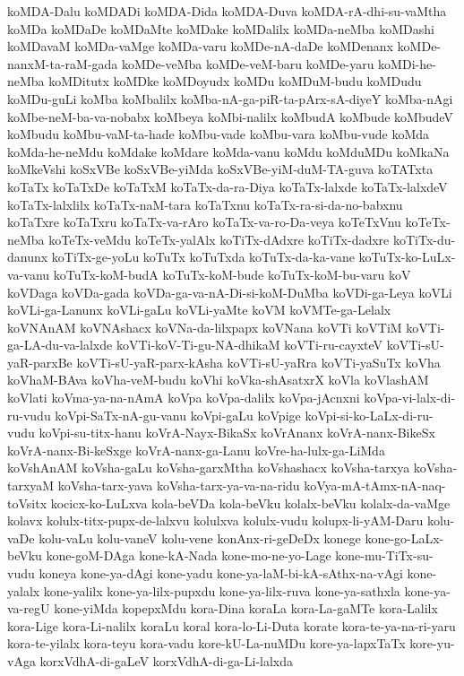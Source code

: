 {koMDA-Dalu
koMDADi
koMDA-Dida
koMDA-Duva
koMDA-rA-dhi-su-vaMtha
koMDa
koMDaDe
koMDaMte
koMDake
koMDalilx
koMDa-neMba
koMDashi
koMDavaM
koMDa-vaMge
koMDa-varu
koMDe-nA-daDe
koMDenanx
koMDe-nanxM-ta-raM-gada
koMDe-veMba
koMDe-veM-baru
koMDe-yaru
koMDi-he-neMba
koMDitutx
koMDke
koMDoyudx
koMDu
koMDuM-budu
koMDudu
koMDu-guLi
koMba
koMbalilx
koMba-nA-ga-piR-ta-pArx-sA-diyeY
koMba-nAgi
koMbe-neM-ba-va-nobabx
koMbeya
koMbi-nalilx
koMbudA
koMbude
koMbudeV
koMbudu
koMbu-vaM-ta-hade
koMbu-vade
koMbu-vara
koMbu-vude
koMda
koMda-he-neMdu
koMdake
koMdare
koMda-vanu
koMdu
koMduMDu
koMkaNa
koMkeVshi
koSxVBe
koSxVBe-yiMda
koSxVBe-yiM-duM-TA-guva
koTATxta
koTaTx
koTaTxDe
koTaTxM
koTaTx-da-ra-Diya
koTaTx-lalxde
koTaTx-lalxdeV
koTaTx-lalxlilx
koTaTx-naM-tara
koTaTxnu
koTaTx-ra-si-da-no-babxnu
koTaTxre
koTaTxru
koTaTx-va-rAro
koTaTx-va-ro-Da-veya
koTeTxVnu
koTeTx-neMba
koTeTx-veMdu
koTeTx-yalAlx
koTiTx-dAdxre
koTiTx-dadxre
koTiTx-du-danunx
koTiTx-ge-yoLu
koTuTx
koTuTxda
koTuTx-da-ka-vane
koTuTx-ko-LuLx-va-vanu
koTuTx-koM-budA
koTuTx-koM-bude
koTuTx-koM-bu-varu
koV
koVDaga
koVDa-gada
koVDa-ga-va-nA-Di-si-koM-DuMba
koVDi-ga-Leya
koVLi
koVLi-ga-Lanunx
koVLi-gaLu
koVLi-yaMte
koVM
koVMTe-ga-Lelalx
koVNAnAM
koVNAshacx
koVNa-da-lilxpapx
koVNana
koVTi
koVTiM
koVTi-ga-LA-du-va-lalxde
koVTi-koV-Ti-gu-NA-dhikaM
koVTi-ru-cayxteV
koVTi-sU-yaR-parxBe
koVTi-sU-yaR-parx-kAsha
koVTi-sU-yaRra
koVTi-yaSuTx
koVha
koVhaM-BAva
koVha-veM-budu
koVhi
koVka-shAsatxrX
koVla
koVlashAM
koVlati
koVma-ya-na-nAmA
koVpa
koVpa-dalilx
koVpa-jAcnxni
koVpa-vi-lalx-di-ru-vudu
koVpi-SaTx-nA-gu-vanu
koVpi-gaLu
koVpige
koVpi-si-ko-LaLx-di-ru-vudu
koVpi-su-titx-hanu
koVrA-Nayx-BikaSx
koVrAnanx
koVrA-nanx-BikeSx
koVrA-nanx-Bi-keSxge
koVrA-nanx-ga-Lanu
koVre-ha-lulx-ga-LiMda
koVshAnAM
koVsha-gaLu
koVsha-garxMtha
koVshashacx
koVsha-tarxya
koVsha-tarxyaM
koVsha-tarx-yava
koVsha-tarx-ya-va-na-ridu
koVya-mA-tAmx-nA-naq-toVsitx
kocicx-ko-LuLxva
kola-beVDa
kola-beVku
kolalx-beVku
kolalx-da-vaMge
kolavx
kolulx-titx-pupx-de-lalxvu
kolulxva
kolulx-vudu
kolupx-li-yAM-Daru
kolu-vaDe
kolu-vaLu
kolu-vaneV
kolu-vene
konAnx-ri-geDeDx
konege
kone-go-LaLx-beVku
kone-goM-DAga
kone-kA-Nada
kone-mo-ne-yo-Lage
kone-mu-TiTx-su-vudu
koneya
kone-ya-dAgi
kone-yadu
kone-ya-laM-bi-kA-sAthx-na-vAgi
kone-yalalx
kone-yalilx
kone-ya-lilx-pupxdu
kone-ya-lilx-ruva
kone-ya-sathxla
kone-ya-va-regU
kone-yiMda
kopepxMdu
kora-Dina
koraLa
kora-La-gaMTe
kora-Lalilx
kora-Lige
kora-Li-nalilx
koraLu
koral
kora-lo-Li-Duta
korate
kora-te-ya-na-ri-yaru
kora-te-yilalx
kora-teyu
kora-vadu
kore-kU-La-nuMDu
kore-ya-lapxTaTx
kore-yu-vAga
korxVdhA-di-gaLeV
korxVdhA-di-ga-Li-lalxda
}
